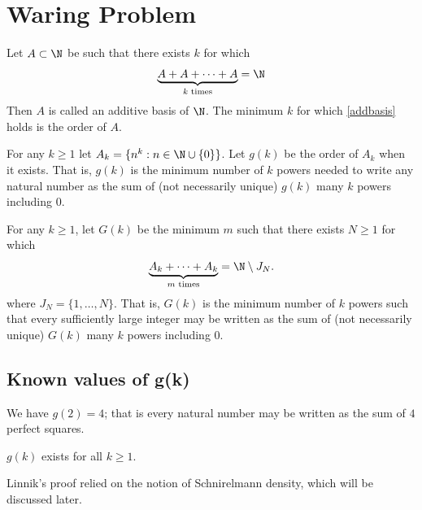 \section{Waring Problem}

\begin{definition}
    Let $A\subset\N$ be such that there exists $k$ for which
    \begin{equation}
        \underbrace{A+A+\cdots+A}_{k\text{ times}}=\N \label{addbasis}
    \end{equation}
    Then $A$ is called an additive basis of $\N$. The minimum $k$ for which \eqref{addbasis} holds is the order of $A$.
\end{definition}

\begin{definition}\label{g(k)}
For any $k\ge1$ let $A_k=\{n^k:n\in\N\cup\{0\}\}$. Let $g(k)$ be the order of $A_k$ when it exists.
That is, $g(k)$ is the minimum number of $k$ powers needed to write any natural number as the sum of (not necessarily unique) $g(k)$ many $k$ powers including 0.
\end{definition}

\begin{definition}\label{G(k)}
For any $k\ge1$, let $G(k)$ be the minimum $m$ such that there exists $N\ge1$ for which
$$\underbrace{A_k+\cdots+A_k}_{m\text{ times}}=\N\setminus J_N.$$
where $J_N=\{1,\dots,N\}$.
That is, $G(k)$ is the minimum number of $k$ powers such that every sufficiently large integer may be written as the sum of (not necessarily unique) $G(k)$ many $k$ powers including 0.
\end{definition}

\subsection{Known values of g(k)}

\begin{theorem}
We have $g(2)=4$; that is every natural number may be written as the sum of $4$ perfect squares.
\end{theorem}

\begin{theorem}
$g(k)$ exists for all $k\ge1$.
\label{HilbertExistence}
\end{theorem}


Linnik's proof relied on the notion of Schnirelmann density, which will be discussed later.

